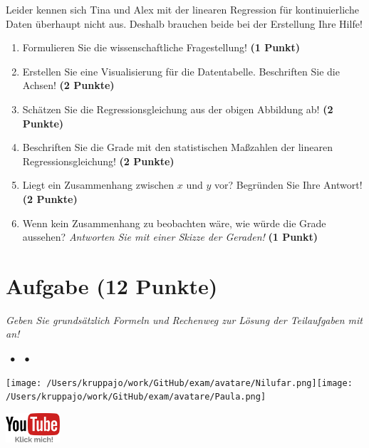 \documentclass[a4paper, 9pt]{scrartcl}\usepackage[]{graphicx}\usepackage[]{xcolor}
\begin{document}
Leider kennen sich Tina und Alex mit der linearen Regression für kontinuierliche Daten überhaupt nicht aus. Deshalb brauchen beide bei der Erstellung Ihre Hilfe!

\begin{enumerate}
\item Formulieren Sie die wissenschaftliche Fragestellung! \textbf{(1 Punkt)}
\item Erstellen  Sie  eine  Visualisierung  für  die  Datentabelle.  Beschriften  Sie  die  Achsen! \textbf{(2 Punkte)}
\item Schätzen Sie die Regressionsgleichung aus der obigen Abbildung ab! \textbf{(2 Punkte)}
\item Beschriften Sie die Grade mit den statistischen Maßzahlen der linearen Regressionsgleichung! \textbf{(2 Punkte)}
\item Liegt ein Zusammenhang zwischen $x$ und $y$ vor? Begründen Sie Ihre Antwort! \textbf{(2 Punkte)}
\item Wenn kein Zusammenhang zu beobachten wäre, wie würde die Grade aussehen? \textit{Antworten Sie mit einer Skizze der Geraden!} \textbf{(1 Punkt)}
\end{enumerate} 
\clearpage

\section{Aufgabe \hfill (12 Punkte)}

\textit{Geben Sie grundsätzlich Formeln und Rechenweg zur Lösung der Teilaufgaben mit an!} \\[1Ex]
 

 
\ifcollection
\begin{flushright}
\tiny\vspace{-3Ex}
\textbf{\examinhaltstart}
\exammodulestat $\;\bullet$
\exammodulestatbbv $\;\bullet$
\exammodulestatversuch 
\vspace{-4Ex}
\end{flushright}
\begin{minipage}[t]{0.5\textwidth}
\texttt{[image: /Users/kruppajo/work/GitHub/exam/avatare/Nilufar.png]}\hspace{-4mm}\texttt{[image: /Users/kruppajo/work/GitHub/exam/avatare/Paula.png]}
\end{minipage}
\begin{minipage}[t]{0.5\textwidth}
\hfill
\href{https://youtu.be/lJp8rFmMnrs}{\includegraphics[width = 2cm]{img/youtube}}
\end{minipage}
\fi
\end{document}
